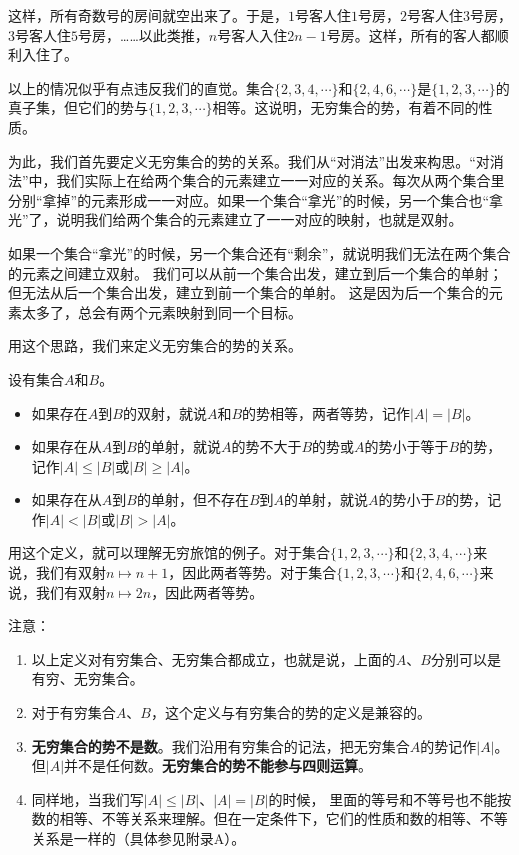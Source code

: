 \documentclass[12pt,UTF8]{ctexbook}
\begin{document}
这样，所有奇数号的房间就空出来了。于是，$1$号客人住$1$号房，$2$号客人住$3$号房，$3$号客人住$5$号房，……以此类推，$n$号客人入住$2n-1$号房。这样，所有的客人都顺利入住了。

以上的情况似乎有点违反我们的直觉。集合$\{2,3,4,\cdots\}$和$\{2,4,6,\cdots\}$是$\{1,2,3,\cdots\}$的真子集，但它们的势与$\{1,2,3,\cdots\}$相等。这说明，无穷集合的势，有着不同的性质。

为此，我们首先要定义无穷集合的势的关系。我们从“对消法”出发来构思。“对消法”中，我们实际上在给两个集合的元素建立一一对应的关系。每次从两个集合里分别“拿掉”的元素形成一一对应。如果一个集合“拿光”的时候，另一个集合也“拿光”了，说明我们给两个集合的元素建立了一一对应的映射，也就是双射。

如果一个集合“拿光”的时候，另一个集合还有“剩余”，就说明我们无法在两个集合的元素之间建立双射。
我们可以从前一个集合出发，建立到后一个集合的单射；但无法从后一个集合出发，建立到前一个集合的单射。
这是因为后一个集合的元素太多了，总会有两个元素映射到同一个目标。

用这个思路，我们来定义无穷集合的势的关系。

\begin{df}\label{df:1-0-0}
    设有集合$A$和$B$。
    \begin{itemize}
        \item 如果存在$A$到$B$的双射，就说$A$和$B$的势相等，两者等势，记作$|A| = |B|$。
        \item 如果存在从$A$到$B$的单射，就说$A$的势不大于$B$的势或$A$的势小于等于$B$的势，记作$|A| \leqslant |B|$或$|B| \geqslant |A|$。
        \item 如果存在从$A$到$B$的单射，但不存在$B$到$A$的单射，就说$A$的势小于$B$的势，记作$|A| < |B|$或$|B| > |A|$。
    \end{itemize}
\end{df}

用这个定义，就可以理解无穷旅馆的例子。对于集合$\{1,2,3,\cdots\}$和$\{2,3,4,\cdots\}$来说，我们有双射$n\mapsto n+1$，因此两者等势。对于集合$\{1,2,3,\cdots\}$和$\{2,4,6,\cdots\}$来说，我们有双射$n\mapsto 2n$，因此两者等势。

注意：
\begin{enumerate}
    \item 以上定义对有穷集合、无穷集合都成立，也就是说，上面的$A$、$B$分别可以是有穷、无穷集合。
    \item 对于有穷集合$A$、$B$，这个定义与有穷集合的势的定义是兼容的。
    \item \textbf{无穷集合的势不是数}。我们沿用有穷集合的记法，把无穷集合$A$的势记作$|A|$。
    但$|A|$并不是任何数。\textbf{无穷集合的势不能参与四则运算}。
    \item 同样地，当我们写$|A| \leqslant |B|$、$|A| = |B|$的时候，
    里面的等号和不等号也不能按数的相等、不等关系来理解。但在一定条件下，它们的性质和数的相等、不等关系是一样的（具体参见附录A）。
\end{enumerate}
\end{document}
